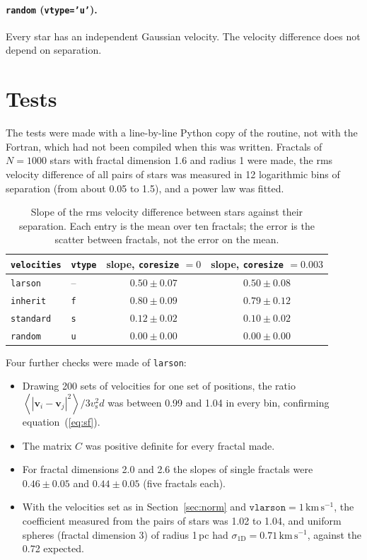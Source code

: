 \documentclass[11pt,a4paper]{article}
\newcommand{\bv}{\mathbf{v}}
\newcommand{\kms}{\mathrm{km\,s^{-1}}}
\newcommand{\vs}{v_{\mathrm s}}
\newcommand{\avg}[1]{\left\langle #1 \right\rangle}
\begin{document}
\paragraph{\texttt{random} (\texttt{vtype='u'}).} Every star has an
independent Gaussian velocity. The velocity difference does not depend
on separation.

\section{Tests}
\label{sec:tests}

The tests were made with a line-by-line Python copy of the routine, not
with the Fortran, which had not been compiled when this was written.
Fractals of $N = 1000$ stars with fractal dimension 1.6 and radius 1
were made, the rms velocity difference of all pairs of stars was
measured in 12 logarithmic bins of separation (from about 0.05 to 1.5),
and a power law was fitted.

\begin{table}[h]
\centering
\begin{tabular}{llcc}
\toprule
\texttt{velocities} & \texttt{vtype} & slope, \texttt{coresize} $=0$ &
  slope, \texttt{coresize} $=0.003$ \\
\midrule
\texttt{larson}   & -- & $0.50 \pm 0.07$ & $0.50 \pm 0.08$ \\
\texttt{inherit}  & \texttt{f} & $0.80 \pm 0.09$ & $0.79 \pm 0.12$ \\
\texttt{standard} & \texttt{s} & $0.12 \pm 0.02$ & $0.10 \pm 0.02$ \\
\texttt{random}   & \texttt{u} & $0.00 \pm 0.00$ & $0.00 \pm 0.00$ \\
\bottomrule
\end{tabular}
\caption{Slope of the rms velocity difference between stars against
their separation. Each entry is the mean over ten fractals; the error is
the scatter between fractals, not the error on the mean.}
\label{tab:slopes}
\end{table}

Four further checks were made of \texttt{larson}:
\begin{itemize}
\item Drawing 200 sets of velocities for one set of positions, the
  ratio $\avg{|\bv_i-\bv_j|^2}/3\vs^2 d$ was between 0.99 and 1.04 in
  every bin, confirming equation~(\ref{eq:sf}).
\item The matrix $C$ was positive definite for every fractal made.
\item For fractal dimensions 2.0 and 2.6 the slopes of single fractals
  were $0.46\pm0.05$ and $0.44\pm0.05$ (five fractals each).
\item With the velocities set as in Section~\ref{sec:norm} and
  $\texttt{vlarson} = 1\,\kms$, the coefficient measured from the pairs
  of stars was 1.02 to 1.04, and uniform spheres (fractal dimension 3)
  of radius 1\,pc had $\sigma_{\mathrm{1D}} = 0.71\,\kms$, against the
  0.72 expected.
\end{itemize}
\end{document}
